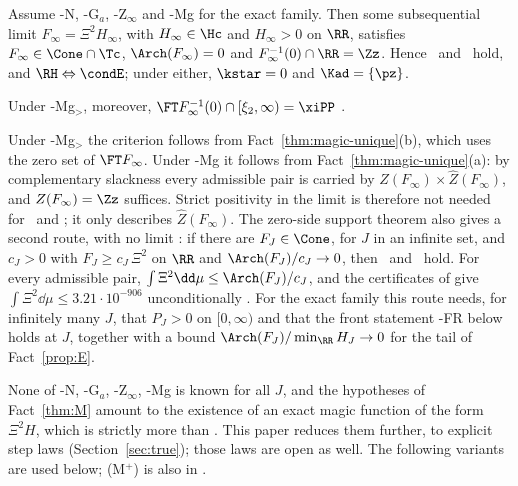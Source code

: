 \begin{fact}\label{thm:M}
Assume \hyp{N}, \hyp{G$_a$}, \hyp{Z$_\infty$} and \hyp{Mg} for the exact family. Then some subsequential limit
$F_\infty=\Xi^2H_\infty$, with $H_\infty\in\Hc$ and $H_\infty>0$ on $\RR$, satisfies $F_\infty\in\Cone\cap\Tc$,
$\Arch(F_\infty)=0$ and $F_\infty^{-1}(0)\cap\RR=\Zz$. Hence \condS\ and \condU\ hold, and $\RH\Leftrightarrow\condE$; under either,
$\kstar=0$ and $\Kad=\{\pz\}$.
\end{fact}

Under \hyp{Mg$_>$}, moreover, $\FT F_\infty^{-1}(0)\cap[\xi_2,\infty)=\xiPP$ \cite{PaperI}.

Under \hyp{Mg$_>$} the criterion follows from Fact~\ref{thm:magic-unique}(b), which uses the zero set of $\FT F_\infty$. Under \hyp{Mg}
it follows from Fact~\ref{thm:magic-unique}(a): by complementary slackness every admissible pair is carried by
$Z(F_\infty)\times\widehat Z(F_\infty)$, and $Z(F_\infty)=\Zz$ suffices. Strict positivity in the limit is therefore not needed for \condS\ and
\condU; it only describes $\widehat Z(F_\infty)$. The zero-side support theorem also gives a second route, with no limit
\cite[Corollary~4.11]{PaperI}: if there are $F_J\in\Cone$, for $J$ in an infinite set, and $c_J>0$ with $F_J\ge c_J\,\Xi^2$ on $\RR$ and
$\Arch(F_J)/c_J\to0$, then \condU\ and \condS\ hold. For every admissible pair, $\int\Xi^2\dd\mu\le\Arch(F_J)/c_J$, and the certificates
of \cite{PaperI} give $\int\Xi^2\dd\mu\le3.21\cdot10^{-906}$ unconditionally \cite[Corollary~5.3]{PaperI}. For the exact family this route needs, for
infinitely many $J$, that $P_J>0$ on $[0,\infty)$ and that the front statement \hyp{FR} below holds at $J$, together with a bound
$\Arch(F_J)/\min_{\RR}H_J\to0$ for the tail of Fact~\ref{prop:E}.

None of \hyp{N}, \hyp{G$_a$}, \hyp{Z$_\infty$}, \hyp{Mg} is known for all $J$, and the hypotheses of Fact~\ref{thm:M} amount to the
existence of an exact magic function of the form $\Xi^2H$, which is strictly more than \condS. This paper reduces them further,
to explicit step laws (Section~\ref{sec:true}); those laws are open as well. The following variants are used below; (M$^+$)
is also in \cite[Remark~4.10(a)]{PaperI}.

